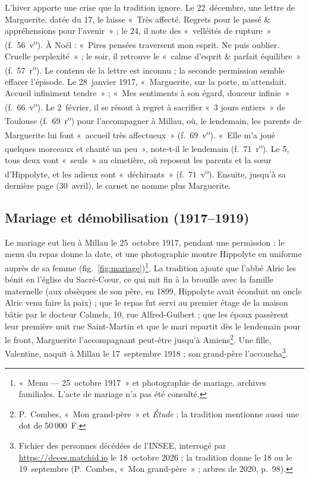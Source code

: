L'hiver apporte une crise que la tradition ignore. Le 22~décembre, une lettre de Marguerite, datée du 17, le laisse «~Très affecté. Regrets pour le passé \& appréhensions pour l'avenir~» ; le 24, il note des «~velléités de rupture~» (f.~56~v\textsuperscript{o}). À Noël : «~Pires pensées traversent mon esprit. Ne puis oublier. Cruelle perplexité~» ; le soir, il retrouve le «~calme d'esprit \& parfait équilibre~» (f.~57~r\textsuperscript{o}). Le contenu de la lettre est inconnu ; la seconde permission semble effacer l'épisode. Le 28~janvier 1917, «~Marguerite, sur la porte, m'attendait. Accueil infiniment tendre~» ; «~Mes sentiments à son égard, douceur infinie~» (f.~66~v\textsuperscript{o}). Le 2~février, il se résout à regret à sacrifier «~3 jours entiers~» de Toulouse (f.~69~r\textsuperscript{o}) pour l'accompagner à Millau, où, le lendemain, les parents de Marguerite lui font «~accueil très affectueux~» (f.~69~v\textsuperscript{o}). «~Elle m'a joué quelques morceaux et chanté un peu~», note-t-il le lendemain (f.~71~r\textsuperscript{o}). Le 5, tous deux vont «~seuls~» au cimetière, où reposent les parents et la sœur d'Hippolyte, et les adieux sont «~déchirants~» (f.~71~v\textsuperscript{o}). Ensuite, jusqu'à sa dernière page (30~avril), le carnet ne nomme plus Marguerite.

\subsection{Mariage et démobilisation (1917--1919)}

Le mariage eut lieu à Millau le 25~octobre 1917, pendant une permission : le menu du repas donne la date, et une photographie montre Hippolyte en uniforme auprès de sa femme (fig.~\ref{fig:mariage})\footnote{«~Menu --- 25~octobre 1917~» et photographie de mariage, archives familiales. L'acte de mariage n'a pas été consulté.}. La tradition ajoute que l'abbé Alric les bénit en l'église du Sacré-Cœur, ce qui mit fin à la brouille avec la famille maternelle (aux obsèques de son père, en 1899, Hippolyte avait éconduit un oncle Alric venu faire la paix) ; que le repas fut servi au premier étage de la maison bâtie par le docteur Calmels, 10, rue Alfred-Guibert ; que les époux passèrent leur première nuit rue Saint-Martin et que le mari repartit dès le lendemain pour le front, Marguerite l'accompagnant peut-être jusqu'à Amiens\footnote{P.~Combes, «~Mon grand-père~» et \textit{Étude} ; la tradition mentionne aussi une dot de 50\,000~F.}. Une fille, Valentine, naquit à Millau le 17~septembre 1918 ; son grand-père l'accoucha\footnote{Fichier des personnes décédées de l'INSEE, interrogé par \url{https://deces.matchid.io} le 18~octobre 2026 ; la tradition donne le 18 ou le 19~septembre (P.~Combes, «~Mon grand-père~» ; arbres de 2020, p.~98).}.

